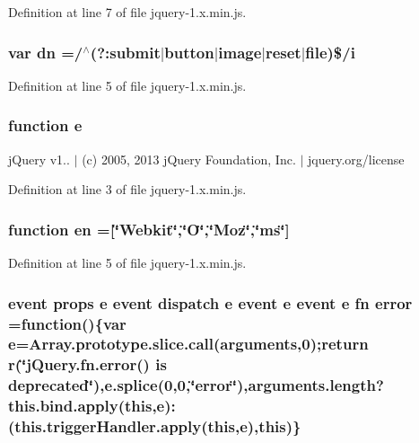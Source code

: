 Definition at line 7 of file jquery-\/1.\+x.\+min.\+js.

\subsubsection[{\texorpdfstring{dn}{dn}}]{\setlength{\rightskip}{0pt plus 5cm}var dn =/$^\wedge$(?\+:submit$\vert$button$\vert$image$\vert$reset$\vert${\bf file})\$/{\bf i}}\hypertarget{jquery-1_8x_8min_8js_ab5e3f3e2b2507b73e2d8092caa5c8650}{}\label{jquery-1_8x_8min_8js_ab5e3f3e2b2507b73e2d8092caa5c8650}


Definition at line 5 of file jquery-\/1.\+x.\+min.\+js.

\subsubsection[{\texorpdfstring{e}{e}}]{\setlength{\rightskip}{0pt plus 5cm}function e}\hypertarget{jquery-1_8x_8min_8js_a2c038346d47955cbe2cb91e338edd7e1}{}\label{jquery-1_8x_8min_8js_a2c038346d47955cbe2cb91e338edd7e1}
j\+Query v1.. $\vert$ (c) 2005, 2013 j\+Query Foundation, Inc. $\vert$ jquery.\+org/license 

Definition at line 3 of file jquery-\/1.\+x.\+min.\+js.

\subsubsection[{\texorpdfstring{en}{en}}]{\setlength{\rightskip}{0pt plus 5cm}function en =\mbox{[}\char`\"{}Webkit\char`\"{},\char`\"{}O\char`\"{},\char`\"{}Moz\char`\"{},\char`\"{}ms\char`\"{}\mbox{]}}\hypertarget{jquery-1_8x_8min_8js_a5d7a777130eac935addcf4926a74b23c}{}\label{jquery-1_8x_8min_8js_a5d7a777130eac935addcf4926a74b23c}


Definition at line 5 of file jquery-\/1.\+x.\+min.\+js.

\subsubsection[{\texorpdfstring{error}{error}}]{ event props {\bf e} event dispatch {\bf e} event {\bf e} event {\bf e} {\bf fn} error =function()\{var {\bf e}=Array.\+prototype.\+slice.\+call(arguments,0);return r(\char`\"{}j\+Query.\+fn.\+error() is deprecated\char`\"{}),e.\+splice(0,0,\char`\"{}error\char`\"{}),arguments.\+length?this.\+bind.\+apply({\bf this},{\bf e})\+:(this.\+trigger\+Handler.\+apply({\bf this},{\bf e}),{\bf this})\}}\hypertarget{jquery-1_8x_8min_8js_a5430e5f3d7ed1df717102cddac071a5f}{}\label{jquery-1_8x_8min_8js_a5430e5f3d7ed1df717102cddac071a5f}


